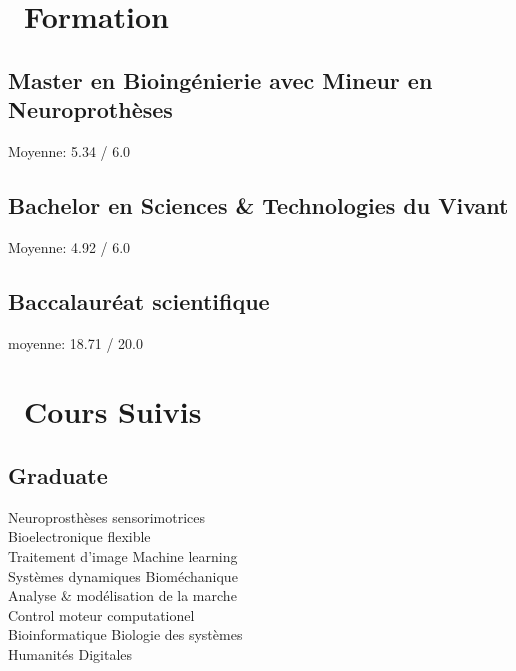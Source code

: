 \documentclass[a4paper]{cv}
\begin{document}
\begin{minipage}[t]{0.33\textwidth}

\section{\texorpdfstring{\faGraduationCap} \ \ Formation}\sectionline

\subsection{Master en Bioingénierie avec Mineur en Neuroprothèses}
Moyenne: 5.34 / 6.0
\sectionspace

\subsection{Bachelor en Sciences \& Technologies du Vivant}
Moyenne: 4.92 / 6.0
\sectionspace

\subsection{Baccalauréat scientifique}
moyenne: 18.71 / 20.0
\sectionspace

\section{\texorpdfstring{\faBook} \ \ Cours Suivis}\sectionline

\subsection{Graduate}
Neuroprosthèses sensorimotrices\\
Bioelectronique flexible\\
Traitement d'image \tbl{} Machine learning\\
Systèmes dynamiques \tbl{} Bioméchanique\\
Analyse \& modélisation de la marche\\
Control moteur computationel\\
Bioinformatique \tbl{} Biologie des systèmes\\
Humanités Digitales
\sectionspace


\end{minipage}
\end{document}
